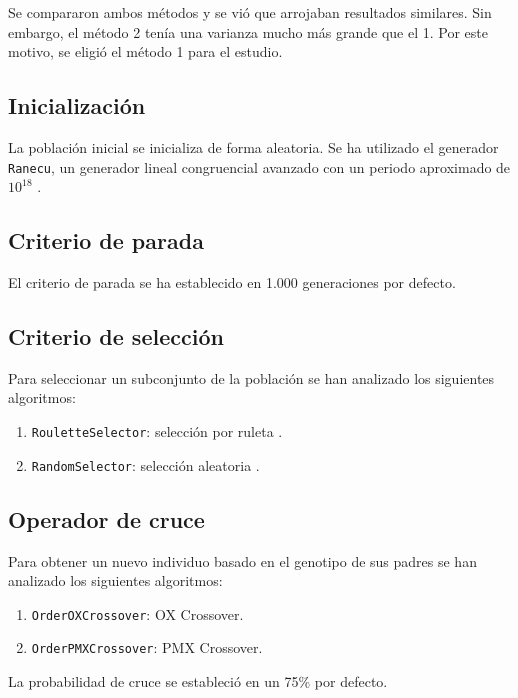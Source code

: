 \documentclass[a4paper,12pt,titlepage]{article}
\begin{document}
Se compararon ambos métodos y se vió que arrojaban resultados similares. Sin embargo, el método 2 tenía una varianza mucho más grande que el 1. Por este motivo, se eligió el método 1 para el estudio.

\subsection{Inicialización}

La población inicial se inicializa de forma aleatoria. Se ha utilizado el generador \lstinline|Ranecu|, un generador lineal congruencial avanzado con un periodo aproximado de $10^{18}$ \citep{jclec:ranecu}.

\subsection{Criterio de parada}

El criterio de parada se ha establecido en 1.000 generaciones por defecto.

\subsection{Criterio de selección}

Para seleccionar un subconjunto de la población se han analizado los siguientes algoritmos:

\begin{enumerate}[noitemsep]
	\item \lstinline|RouletteSelector|: selección por ruleta \citep{jclec:roulette}.
	\item \lstinline|RandomSelector|: selección aleatoria \citep{jclec:random}.
\end{enumerate}

\subsection{Operador de cruce}

Para obtener un nuevo individuo basado en el genotipo de sus padres se han analizado los siguientes algoritmos:

\begin{enumerate}[noitemsep]
	\item \lstinline|OrderOXCrossover|: OX Crossover. 
	\item \lstinline|OrderPMXCrossover|: PMX Crossover.
\end{enumerate}

La probabilidad de cruce se estableció en un 75\% por defecto.
\end{document}
